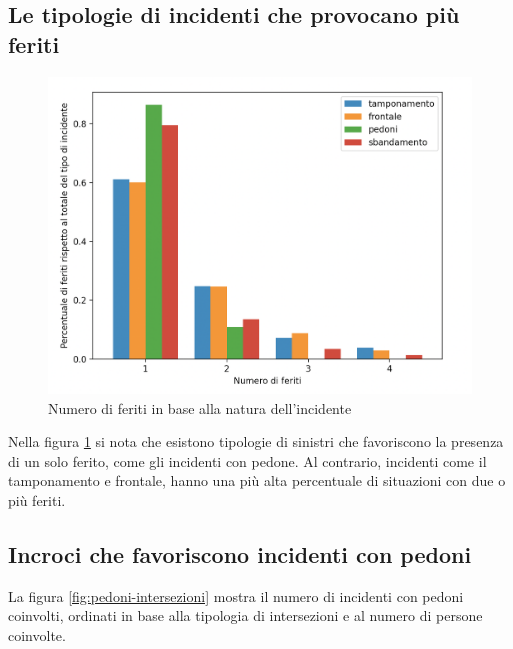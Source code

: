 \documentclass[a4paper]{report}
\begin{document}
\subsection{Le tipologie di incidenti che provocano più feriti}

\begin{figure}
    \includegraphics[width=\linewidth]{../src/incidenti/incidenti_senza_coords/natura_incidente/numero_feriti.png}
    \caption{Numero di feriti in base alla natura dell'incidente}
    \label{fig:numero-feriti}
\end{figure}

Nella figura \ref{fig:numero-feriti} si nota che esistono tipologie di sinistri che 
favoriscono la presenza di un solo ferito, come gli incidenti con pedone. 
Al contrario, incidenti come il tamponamento e frontale, 
hanno una più alta percentuale di situazioni con due o più feriti.

\subsection{Incroci che favoriscono incidenti con pedoni}

La figura \ref{fig:pedoni-intersezioni} mostra il numero di incidenti con pedoni coinvolti, 
ordinati in base alla tipologia di intersezioni e al numero di persone coinvolte.
\end{document}

